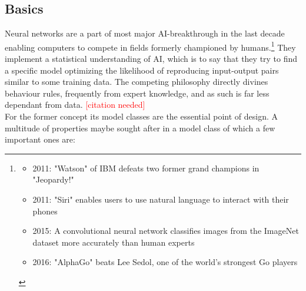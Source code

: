 \subsection{Basics}
Neural networks are a part of most major AI-breakthrough in the last decade enabling computers to compete in fields formerly championed by humans.\footnote{\begin{itemize}
		\item 
			2011: "Watson" of IBM defeats two former grand champions in "Jeopardy!" \cite{lally2011natural}
		\item 
			2011: "Siri" enables users to use natural language to interact with their phones 
			\cite{ARON201124}
		\item 
			2015: A convolutional neural network classifies images from the ImageNet dataset more accurately than human experts 
			\cite{Russakovsky2015} \cite{He_2015_ICCV}
		\item 
			2016: "AlphaGo" beats Lee Sedol, one of the world's strongest Go players
			\cite{gibney2016google} \cite{silver2017mastering}
	\end{itemize}
}
They implement a statistical understanding of AI, which is to say that they try to find a specific model optimizing the likelihood of reproducing input-output pairs similar to some training data. The competing philosophy directly divines behaviour rules, frequently from expert knowledge, and as such is far less dependant from data.  
\textcolor{red}{[citation needed]}\\
For the former concept its model classes are the essential point of design. A multitude of properties maybe sought after in a model class of which a few important ones are:
